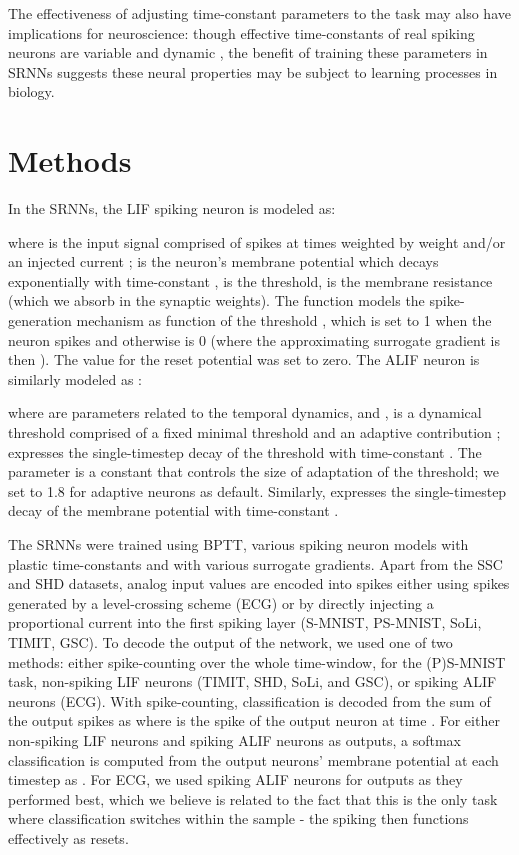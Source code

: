 \documentclass[fleqn,10pt]{wlscirep}
\begin{document}
The effectiveness of adjusting time-constant parameters to the task may also have implications for neuroscience: though effective time-constants of real spiking neurons are variable and dynamic \cite{gerstner2002spiking}, the benefit of training these parameters in SRNNs suggests these neural properties may be subject to learning processes in biology. 


\section*{Methods}

In the SRNNs, the LIF spiking neuron is modeled as:

where  is the input signal comprised of spikes at times  weighted by weight  and/or an injected current ;  is the neuron's membrane potential which decays exponentially with time-constant ,  is the threshold,  is the membrane resistance (which we absorb in the synaptic weights). The function  models the spike-generation mechanism as function of the threshold , which is set to 1 when the neuron spikes and otherwise is 0 (where the approximating surrogate gradient is then ). The value for the reset potential  was set to zero. The ALIF neuron is similarly modeled as :

where  are parameters related to the temporal dynamics,  and ,  is a dynamical threshold comprised of a fixed minimal threshold  and an adaptive contribution ;  
 expresses the single-timestep decay of the threshold with time-constant . The parameter  is a constant that controls the size of adaptation of the threshold; we set  to 1.8 for adaptive neurons as default. Similarly,  expresses the single-timestep decay of the membrane potential with time-constant .

The SRNNs were trained using BPTT, various spiking neuron models with plastic time-constants and with various surrogate gradients. Apart from the SSC and SHD datasets, analog input values are encoded into spikes either using spikes generated by a level-crossing scheme (ECG) or by directly injecting a proportional current into the first spiking layer (S-MNIST, PS-MNIST, SoLi, TIMIT, GSC). To decode the output of the network, we used one of two methods: either spike-counting over the whole time-window, for the (P)S-MNIST task, non-spiking LIF neurons (TIMIT, SHD, SoLi, and GSC), or spiking ALIF neurons (ECG). With spike-counting, classification is decoded from the sum of the output spikes as  where  is the spike of the output neuron  at time . For either non-spiking LIF neurons and spiking ALIF neurons as outputs, a softmax classification is computed from the output neurons' membrane potential  at each timestep as . For ECG, we used spiking ALIF neurons for outputs as they performed best, which we believe is related to the fact that this is the only task where classification switches within the sample - the spiking then functions effectively as resets.
\end{document}
